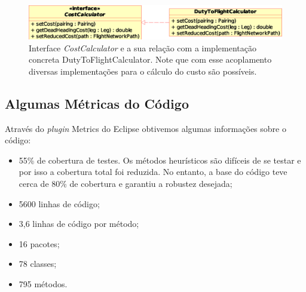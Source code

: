 \begin{figure}[htbp]
	\begin{center}
		\includegraphics[scale=0.65]{fig/cost_calculator.eps}
		\caption{Interface {\it CostCalculator} e a sua relação com a implementação concreta
    DutyToFlightCalculator. Note que com esse acoplamento diversas implementações para o cálculo do
    custo são possíveis.}
		\label{fig:cost_interface}
	\end{center}
\end{figure}



\subsection{Algumas Métricas do Código}
\label{sec:metricas}

Através do {\it plugin} Metrics do Eclipse obtivemos algumas informações sobre o código: 

\begin{itemize}
\item 55\% de cobertura de testes. Os métodos heurísticos são difíceis de se testar e por isso a
cobertura total foi reduzida. No entanto, a base do código teve cerca de 80\% de cobertura e 
garantiu a robustez desejada;
\item 5600 linhas de código; 
\item 3,6 linhas de código por método; 
\item 16 pacotes; 
\item 78 classes; 
\item 795 métodos.
\end{itemize}

